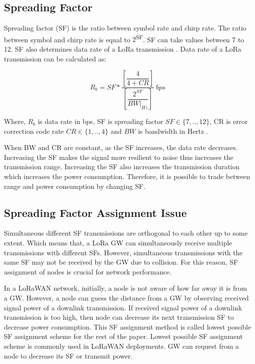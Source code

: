 \documentclass[conference]{IEEEtran}
\begin{document}
\subsection{Spreading Factor}
\par Spreading factor (SF) is the ratio between symbol rate and chirp rate. The ratio between symbol and chirp rate is equal to $2$\textsuperscript{SF}. SF can take values between 7 to 12. SF also determines data rate of a LoRa transmission \cite{AN1200.22}. Data rate of a LoRa transmission can be calculated as:

\begin{equation} \label{eq:bit_rate_sf}
R_{b} = SF * \dfrac{\left[ \dfrac{4}{4+CR} \right] }{ \left[ \dfrac{2^{SF}}{BW|_{Hz}} \right]} \ bps
\end{equation}

Where, $R_{b}$ is data rate in bps, SF is spreading factor $SF \in \{7,..,12\}$, CR is error correction code rate $CR \in \{1,..,4\}$ and $BW$ is bandwidth in Hertz \cite{AN1200.22}.

\par When BW and CR are constant, as the SF increases, the data rate decreases. Increasing the SF makes the signal more resilient to noise thus increases the transmission range. Increasing the SF also increases the transmission duration which increases the power consumption. Therefore, it is possible to trade between range and power consumption by changing SF.

\subsection{Spreading Factor Assignment Issue}
\par Simultaneous different SF transmissions are orthogonal to each other up to some extent. Which means that, a LoRa GW can simultaneously receive multiple transmissions with different SFs. However, simultaneous transmissions with the same SF may not be received by the GW due to collision. For this reason, SF assignment of nodes is crucial for network performance.

\par In a LoRaWAN network, initially, a node is not aware of how far away it is from a GW. However, a node can guess the distance from a GW by observing received signal power of a downlink transmission. If received signal power of a downlink transmission is too high, then node can decrease its next transmission SF to decrease power consumption. This SF assignment method is called lowest possible SF assignment scheme for the rest of the paper. Lowest possible SF assignment scheme is commonly used in LoRaWAN deployments. GW can request from a node to decrease its SF or transmit power.
\end{document}

